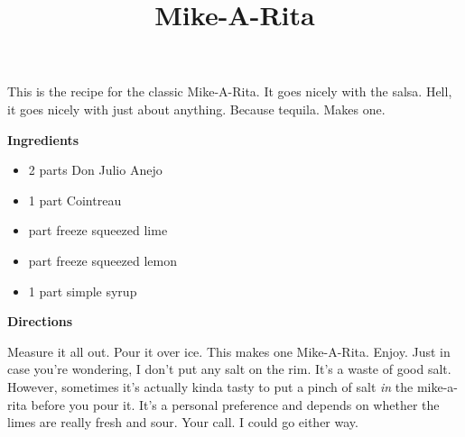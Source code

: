 \documentclass{article}
\title{Mike-A-Rita}
\begin{document}
This is the recipe for the classic Mike-A-Rita. It goes nicely with the salsa. Hell, it goes nicely
with just about anything. Because tequila. Makes one.

\bigskip

\bigskip

\textbf{Ingredients}

\begin{itemize}
      \item 2 parts Don Julio Anejo
      \item 1 part Cointreau
      \item {} part freeze squeezed lime
      \item {} part freeze squeezed lemon
      \item 1 part simple syrup
\end{itemize}

\bigskip

\textbf{Directions}

Measure it all out. Pour it over ice. This makes one Mike-A-Rita. Enjoy. Just in case you're
wondering, I don't put any salt on the rim. It's a waste of good salt. However, sometimes
it's actually kinda tasty to put a pinch of salt \textit{in} the mike-a-rita before you
pour it. It's a personal preference and depends on whether the limes are really fresh
and sour. Your call. I could go either way.

\end{document}
